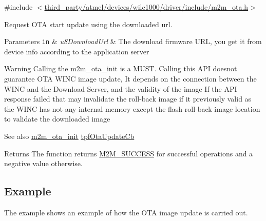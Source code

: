 {\ttfamily \#include $<$\hyperlink{m2m__ota_8h}{third\+\_\+party/atmel/devices/wilc1000/driver/include/m2m\+\_\+ota.\+h}$>$}



Request O\+TA start update using the downloaded url. 


\begin{DoxyParams}[1]{Parameters}
\mbox{\tt in}  & {\em u8\+Download\+Url} & The download firmware U\+RL, you get it from device info according to the application server\\
\hline
\end{DoxyParams}
\begin{DoxyWarning}{Warning}
Calling the m2m\+\_\+ota\+\_\+init is a M\+U\+ST. Calling this A\+PI doesnot guarantee O\+TA W\+I\+NC image update, It depends on the connection between the W\+I\+NC and the Download Server, and the validity of the image If the A\+PI response failed that may invalidate the roll-\/back image if it previously valid as the W\+I\+NC has not any internal memory except the flash roll-\/back image location to validate the downloaded image
\end{DoxyWarning}
\begin{DoxySeeAlso}{See also}
\hyperlink{group__OtaInitFn_gacd2a1a8ffaccc3deb1970cf1ad41ceec}{m2m\+\_\+ota\+\_\+init} \hyperlink{group__OTATYPEDEF_ga86bdacc22dca0d0844e0825d81fb4f85}{tpf\+Ota\+Update\+Cb}
\end{DoxySeeAlso}
\begin{DoxyReturn}{Returns}
The function returns \hyperlink{nm__common_8h_a9ef27ba27aafdd1aa3a79d3ba2c36b8f}{M2\+M\+\_\+\+S\+U\+C\+C\+E\+SS} for successful operations and a negative value otherwise. 
\end{DoxyReturn}
\hypertarget{group__WifiEnableMonitorModeFn_Example}{}\subsection{Example}\label{group__WifiEnableMonitorModeFn_Example}
The example shows an example of how the O\+TA image update is carried out. 
